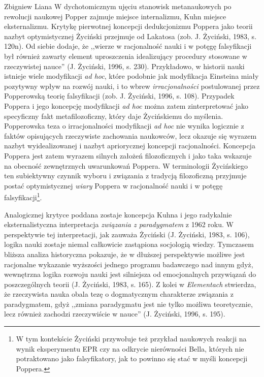\begin{artplenv}{Zbigniew Liana}
W dychotomicznym ujęciu stanowisk metanaukowych po rewolucji naukowej Popper zajmuje miejsce internalizmu, Kuhn miejsce
eksternalizmu. Krytykę pierwotnej koncepcji dedukcjonizmu Poppera jako teorii nazbyt optymistycznej Życiński przejmuje
od Lakatosa \label{ref:RNDCRLw5MmQwf}(zob. J. Życiński, 1983, s. 120n). Od siebie dodaje, że  ,,wierze w racjonalność
nauki i w potęgę falsyfikacji był również zawarty element uproszczenia idealizujący procedury stosowane w rzeczywistej
nauce'' \label{ref:RNDR9nCa1gaG1}(J. Życiński, 1996, s. 230).  Przykładowo, w historii nauki istnieje wiele modyfikacji
\textit{ad hoc}, które podobnie jak modyfikacja Einsteina miały pozytywny wpływ na rozwój nauki, i to wbrew
\textit{irracjonalności} postulowanej przez Popperowską teorię falsyfikacji \label{ref:RNDq9oApJerP4}(zob. J. Życiński,
1996, s. 108). Przypadek Poppera i jego koncepcję modyfikacji \textit{ad hoc} można zatem zinterpretować jako specyficzny
fakt metafilozoficzny, który daje Życińskiemu do myślenia. Popperowska teza o irracjonalności modyfikacji \textit{ad hoc}
nie wynika logicznie z faktów opisujących rzeczywiste zachowania naukowców, lecz okazuje się wyrazem nazbyt
wyidealizowanej i nazbyt apriorycznej koncepcji racjonalności. Koncepcja Poppera jest zatem wyrazem silnych założeń
filozoficznych i jako taka wskazuje na obecność zewnętrznych uwarunkowań Poppera. W terminologii Życińskiego ten
subiektywny czynnik wyboru i związania z tradycją filozoficzną przyjmuje postać optymistycznej \textit{wiary}
Poppera w racjonalność nauki i w potęgę falsyfikacji\footnote{W tym kontekście Życiński przywołuje też przykład naukowych reakcji
na wynik eksperymentu EPR czy na  odkrycie nierówności Bella, których nie potraktowano jako falsyfikatory, jak to
powinno się stać w myśli koncepcji Poppera.}.

Analogicznej krytyce poddana zostaje koncepcja Kuhna i jego radykalnie eksternalistyczna interpretacja
\textit{związania z	paradygmatem} z 1962 roku. W perspektywie tej interpretacji, jak zauważa Życiński \label{ref:RNDaETzNFGzG9}(J.
Życiński, 1983, s. 106), logika nauki zostaje niemal całkowicie zastąpiona socjologią wiedzy. Tymczasem bliższa analiza
historyczna pokazuje, że w dłuższej perspektywie możliwe jest racjonalne wykazanie wyższości jednego programu
badawczego nad innym gdyż, wewnętrzna logika rozwoju nauki jest silniejsza od emocjonalnych przywiązań do
poszczególnych teorii \label{ref:RND184R61G3Ny}(J. Życiński, 1983, s. 165). Z kolei w \textit{Elementach} stwierdza, że
rzeczywista nauka obala tezę o dogmatycznym charakterze związania z paradygmatem, gdyż ,,zmiana paradygmatu jest nie
tylko możliwa teoretycznie, lecz również zachodzi rzeczywiście w nauce'' \label{ref:RND8iXlMhyTs3}(J. Życiński, 1996, s. 195).


\end{artplenv}
